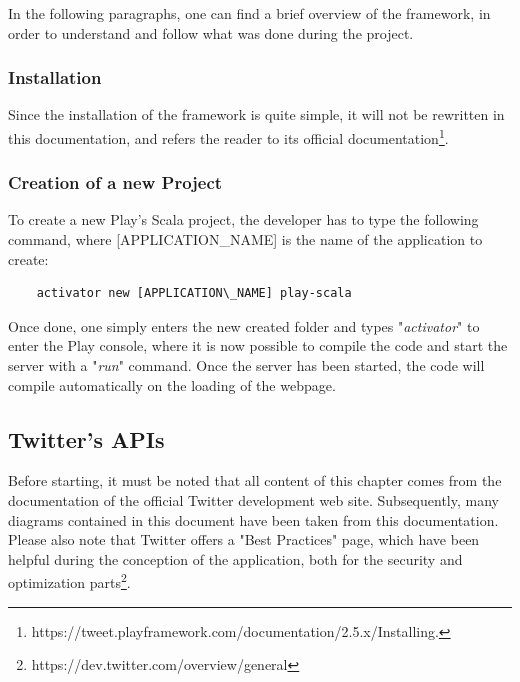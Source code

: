 \documentclass[a4paper,11pt]{report}
\begin{document}
In the following paragraphs, one can find a brief overview of the framework, in order to understand and follow what was done during the project.

\subsubsection{Installation}
Since the installation of the framework is quite simple, it will not be rewritten in this documentation, and refers the reader to its official documentation\footnote{https://tweet.playframework.com/documentation/2.5.x/Installing.}.

\subsubsection{Creation of a new Project}
To create a new Play's Scala project, the developer has to type the following command, where [APPLICATION\_NAME] is the name of the application to create:
\begin{lstlisting}
	activator new [APPLICATION\_NAME] play-scala
\end{lstlisting}
Once done, one simply enters the new created folder and types "\emph{activator}" to enter the Play console, where it is now possible to compile the code and start the server with a "\emph{run}" command. Once the server has been started, the code will compile automatically on the loading of the webpage.
\bigskip

\subsection{Twitter's APIs}
Before starting, it must be noted that all content of this chapter comes from the documentation of the official Twitter development web site\cite{twitter2016}. Subsequently, many diagrams contained in this document have been taken from this documentation.\\

Please also note that Twitter offers a "Best Practices" page, which have been helpful during the conception of the application, both for the security and optimization parts\footnote{https://dev.twitter.com/overview/general}.
\end{document}
